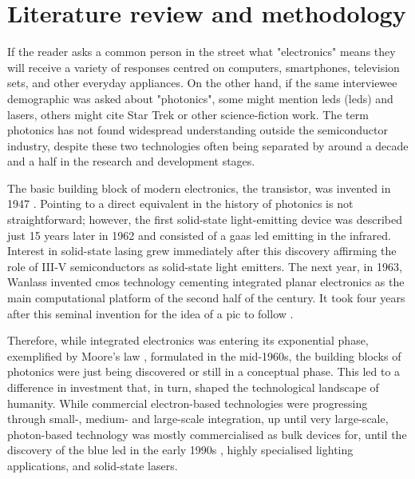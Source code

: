 \chapter{Literature review and methodology}
\label{chap:review}

If the reader asks a common person in the street what "electronics" means they will receive a variety of responses centred on computers, smartphones, television sets, and other everyday appliances. On the other hand, if the same interviewee demographic was asked about "photonics", some might mention \acl{led}s (\acs{led}s) and lasers, others might cite Star Trek or other science-fiction work. The term photonics has not found widespread understanding outside the semiconductor industry, despite these two technologies often being separated by around a decade and a half in the research and development stages. 

The basic building block of modern electronics, the transistor, was invented in 1947 \cite{Bardeen1948, Bardeen1950}. Pointing to a direct equivalent in the history of photonics is not straightforward; however, the first solid-state light-emitting device was described just \num{15} years later in 1962 \cite{Biard1966} and consisted of a \acf{gaas} \acs{led} emitting in the infrared. Interest in solid-state lasing grew immediately after this discovery \cite{Hall1962, Hall1963} affirming the role of III-V semiconductors as solid-state light emitters. The next year, in 1963, Wanlass invented \acf{cmos} technology \cite{Wanlass1967} cementing integrated planar electronics as the main computational platform of the second half of the century. It took four years after this seminal invention for the idea of a \acf{pic} to follow \cite{Miller1969}.

Therefore, while integrated electronics was entering its exponential phase, exemplified by Moore's law \cite{Moore1965}, formulated in the mid-1960s, the building blocks of photonics were just being discovered or still in a conceptual phase. This led to a difference in investment that, in turn, shaped the technological landscape of humanity. While commercial electron-based technologies were progressing through small-, medium- and large-scale integration, up until very large-scale, photon-based technology was mostly commercialised as bulk devices for, until the discovery of the blue \acs{led} in the early 1990s \cite{Nakamura1994}, highly specialised lighting applications, and solid-state lasers. 


